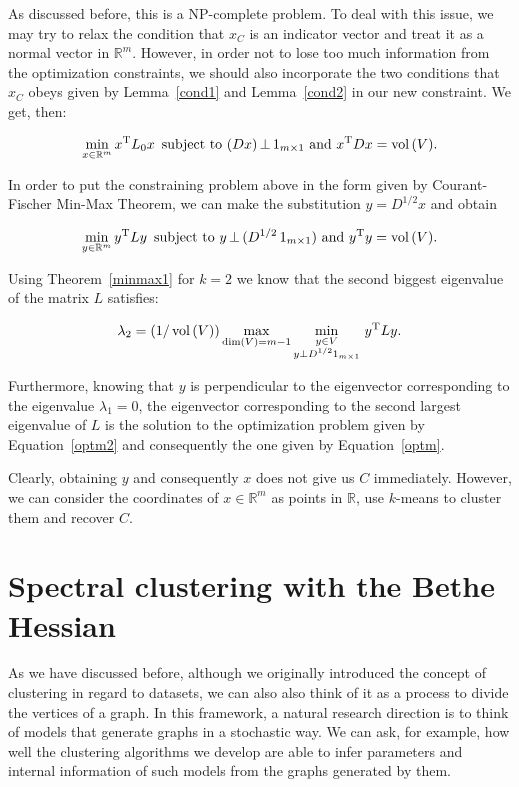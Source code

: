 As discussed before, this is a NP-complete problem.
To deal with this issue, we may try to relax the condition that $x_C$ is an indicator vector and treat it as a normal vector in $\mathbb R^{m }$.
However, in order not to lose too much information from the optimization constraints, we should also incorporate the two conditions that $x_C$ obeys given by Lemma~\ref{cond1} and Lemma~\vref{cond2} in our new constraint. We get, then:

\begin{equation}
   \min_{x \in \mathbb R^{m }} {x}^{\rm T}L_0{x}\,\text{ subject to } (Dx)\, \bot \, 1_{m \times 1}  \text{ and } x^{\rm T} D x = \operatorname*{vol\,} (V).
\end{equation}

In order to put the constraining problem above in the form given by Courant-Fischer Min-Max Theorem, we can make the substitution $y = D^{1/2}x$ and obtain

\begin{equation} \label{optm}
   \min_{y \in \mathbb R^{m }} y^{\rm T}Ly \,\text{ subject to } y \, \bot \, (D^{1/2} \,1_{m \times 1}) \text{ and } y^{\rm T} y = \operatorname*{vol\,} (V).
\end{equation}

Using Theorem~\vref{minmax1} for $k = 2$ we know that the second biggest eigenvalue of the matrix $L$ satisfies:

\begin{equation}\label{optm2}
   \lambda_2 = \left( 1/\operatorname*{vol\,}(V) \right) \max_{\dim (V) = m-1} \min_{\substack{y \in V \\ y \bot D^{1/2}1_{m \times 1}}} \, y^{\rm T}Ly.
\end{equation}

Furthermore, knowing that $y$ is perpendicular to the eigenvector corresponding to the eigenvalue $\lambda_1 = 0$, the eigenvector corresponding to the second largest eigenvalue of $L$ is the solution to the optimization problem given by Equation~\ref{optm2} and consequently the one given by Equation~\ref{optm}.

Clearly, obtaining $y$ and consequently $x$ does not give us $C$ immediately.
However, we can consider the coordinates of $x \in \mathbb R^{m }$ as points in $\mathbb R$, use $k$-means to cluster them and recover $C$.

\chapter{Spectral clustering with the Bethe Hessian} \label{bethechapter}
As we have discussed before, although we originally introduced the concept of clustering in regard to datasets, we can also also think of it as a process to divide the vertices of a graph.
In this framework, a natural research direction is to think of models that generate graphs in a stochastic way. We can ask, for example, how well the clustering algorithms we develop are able to infer parameters and internal information of such models from the graphs generated by them.

